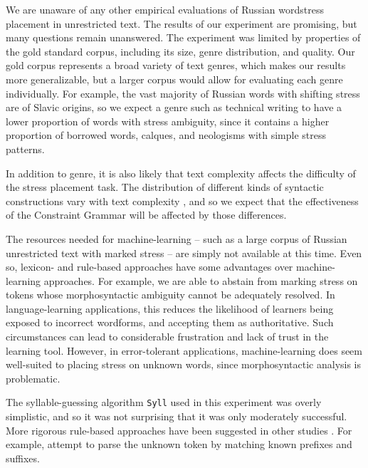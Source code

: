 \documentclass[11pt]{article}
\newcommand{\lj}[1]{\marginpar{\scriptsize L: #1}} %
\begin{document}
We are unaware of any other empirical evaluations of Russian wordstress placement 
in unrestricted text. The results of our experiment are promising, but many 
questions remain unanswered.
The experiment was limited by properties of the gold standard corpus, including
its size, genre distribution, and quality.
Our gold corpus represents a broad variety of text genres, which 
makes our results more generalizable, but a larger corpus would allow for
evaluating each genre individually. For example, the vast majority of Russian
words with shifting stress are of Slavic origins, so we expect a genre such as 
technical writing to have a lower proportion of words with stress ambiguity, 
since it contains a higher proportion of borrowed words, calques, and neologisms 
with simple stress patterns.\lj{What about NomPl/AccPl -a spreading in tech jargon?}

In addition to genre, it is also likely that text
complexity affects the difficulty of the stress placement task. The distribution
of different kinds of syntactic constructions vary with text complexity 
\cite{Vajjala.Meurers-12}, and so we expect that the effectiveness of the 
Constraint Grammar will be affected by those differences.

The resources needed for machine-learning -- such as a large corpus of Russian 
unrestricted text with marked stress -- are simply
not available at this time. Even so, lexicon- and rule-based approaches have
some advantages over machine-learning approaches. For example, we are able to
abstain from marking stress on tokens whose morphosyntactic ambiguity cannot be
adequately resolved. In language-learning applications, this reduces the 
likelihood of learners being exposed to incorrect wordforms, and accepting them
as authoritative. Such circumstances can lead to considerable frustration and
lack of trust in the learning tool. However, in error-tolerant applications, 
machine-learning does seem well-suited to placing stress on unknown words, since 
morphosyntactic analysis is problematic.

The syllable-guessing algorithm {\small {\tt Syll}} used in this 
experiment was overly simplistic, and so it was not surprising that it was only 
moderately successful. More rigorous rule-based approaches have been suggested in 
other studies \cite{Church-85,Williams-87,Xomicevic_2008}. For example, 
 attempt to parse the unknown token by matching known 
prefixes and suffixes.
\end{document}
